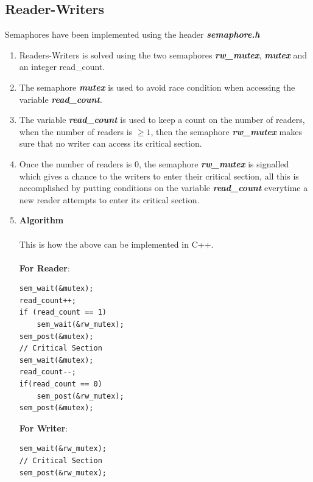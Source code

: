 \documentclass[a4paper,12pt]{report}
\begin{document}
\subsection{Reader-Writers}
Semaphores have been implemented using the header \textbf{\textit{semaphore.h}}
\begin{enumerate}
\item Readers-Writers is solved using the two semaphores \textit{\textbf{rw\_mutex}}, \textbf{\textit{mutex}} and an integer read\_count.
\item The semaphore \textit{\textbf{mutex}} is used to avoid race condition when accessing the variable \textit{\textbf{read\_count}}.
\item The variable \textit{\textbf{read\_count}} is used to keep a count on the number of readers, when the number of readers is $\geq 1$, then the semaphore \textbf{\textit{rw\_mutex}} makes sure that no writer can access its critical section.
\item Once the number of readers is 0, the semaphore \textit{\textbf{rw\_mutex}} is signalled which gives a chance to the writers to enter their critical section, all this is accomplished by putting conditions on the variable \textit{\textbf{read\_count}} everytime a new reader attempts to enter its critical section.
\item \textbf{Algorithm}\\\\
This is how the above can be implemented in C++.\\\\
\textbf{For Reader}:
\begin{lstlisting}
sem_wait(&mutex);
read_count++;
if (read_count == 1)
	sem_wait(&rw_mutex);
sem_post(&mutex);
// Critical Section
sem_wait(&mutex);
read_count--;
if(read_count == 0)
	sem_post(&rw_mutex);
sem_post(&mutex);
\end{lstlisting}
\textbf{For Writer}:
\begin{lstlisting}
sem_wait(&rw_mutex);
// Critical Section
sem_post(&rw_mutex);
\end{lstlisting}
\end{enumerate}
\end{document}
